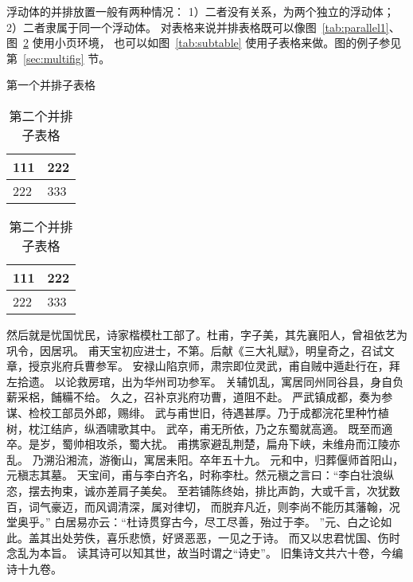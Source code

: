 浮动体的并排放置一般有两种情况：
1）二者没有关系，为两个独立的浮动体；
2）二者隶属于同一个浮动体。
对表格来说并排表格既可以像图~\ref{tab:parallel1}、图~\ref{tab:parallel2} 使用小页环境，
也可以如图~\ref{tab:subtable} 使用子表格来做。图的例子参见第~\ref{sec:multifig} 节。
\begin{table}[h]
\noindent\begin{minipage}{0.5\textwidth}
\centering
\caption{第一个并排子表格}
\label{tab:parallel1}
\begin{tabular}{p{2cm}p{2cm}}
\toprule[1.5pt]
111 & 222 \\\midrule[1pt]
222 & 333 \\\bottomrule[1.5pt]
\end{tabular}
\end{minipage}
\begin{minipage}{0.5\textwidth}
\centering
\caption{第二个并排子表格}
\label{tab:parallel2}
\begin{tabular}{p{2cm}p{2cm}}
\toprule[1.5pt]
111 & 222 \\\midrule[1pt]
222 & 333 \\\bottomrule[1.5pt]
\end{tabular}
\end{minipage}
\end{table}

然后就是忧国忧民，诗家楷模杜工部了。杜甫，字子美，其先襄阳人，曾祖依艺为巩令，因居巩。
甫天宝初应进士，不第。后献《三大礼赋》，明皇奇之，召试文章，授京兆府兵曹参军。
安禄山陷京师，肃宗即位灵武，甫自贼中遁赴行在，拜左拾遗。
以论救房琯，出为华州司功参军。
关辅饥乱，寓居同州同谷县，身自负薪采梠，餔糒不给。
久之，召补京兆府功曹，道阻不赴。
严武镇成都，奏为参谋、检校工部员外郎，赐绯。
武与甫世旧，待遇甚厚。乃于成都浣花里种竹植树，枕江结庐，纵酒啸歌其中。
武卒，甫无所依，乃之东蜀就高適。
既至而適卒。是岁，蜀帅相攻杀，蜀大扰。
甫携家避乱荆楚，扁舟下峡，未维舟而江陵亦乱。
乃溯沿湘流，游衡山，寓居耒阳。卒年五十九。
元和中，归葬偃师首阳山，元稹志其墓。
天宝间，甫与李白齐名，时称李杜。然元稹之言曰：“李白壮浪纵恣，摆去拘束，诚亦差肩子美矣。
至若铺陈终始，排比声韵，大或千言，次犹数百，词气豪迈，而风调清深，属对律切，
而脱弃凡近，则李尚不能历其藩翰，况堂奥乎。”
白居易亦云：“杜诗贯穿古今，尽工尽善，殆过于李。
”元、白之论如此。盖其出处劳佚，喜乐悲愤，好贤恶恶，一见之于诗。
而又以忠君忧国、伤时念乱为本旨。
读其诗可以知其世，故当时谓之“诗史”。
旧集诗文共六十卷，今编诗十九卷。

\begin{table}
\centering
\caption{并排子表格}
\label{tab:subtable}
\hskip2cm
\end{table}

